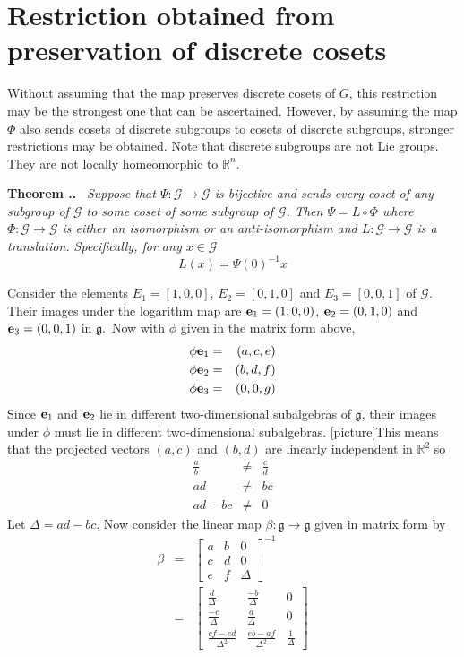 \documentclass[honours]{UNSWthesis}
\newcommand{\R}{\mathbb{R}}
\newcommand{\G}{\mathcal{G}}
\newcommand{\g}{\mathfrak{g}}
\newcommand{\1}{\mathbf{e}_{1}}
\newcommand{\2}{\mathbf{e}_{3}}
\newcommand{\3}{\mathbf{e}_{3}}
\newcounter{Item}[section]
\newenvironment{Theorem}{\medskip
                            \refstepcounter{Item}
                            \noindent
                           {\bf Theorem \thesection.\theItem.}\ %
                            \begingroup \sl}
                           {\endgroup\medskip}
\begin{document}

\section{Restriction obtained from preservation of discrete cosets}
Without assuming that the map preserves discrete cosets of $G$, this restriction may be the strongest one that can be ascertained. However, by assuming the map $\Phi$ also sends cosets of discrete subgroups to cosets of discrete subgroups, stronger restrictions may be obtained. Note that discrete subgroups are not Lie groups. They are not locally homeomorphic to $\R^{n}$. 

\begin{Theorem}
Suppose that $\Psi: \G \longrightarrow \G$ is bijective and sends every coset of \emph{any} subgroup of $\G$ to some coset of some subgroup of $\G$. Then $\Psi=L \circ \Phi$ where $\Phi:\G \longrightarrow \G$ is either an isomorphism or an anti-isomorphism and $L: \G \longrightarrow \G$ is a translation. Specifically, for any $x \in \G$
\[
L(x)=\Psi(0)^{-1}x
\]

\end{Theorem}

Consider the elements $E_{1}=[1,0,0]$, $E_{2}=[0,1,0]$ and $E_{3}=[0,0,1]$ of $\G$. Their images under the logarithm map are ${\bf e}_{1}=(1,0,0)$, ${\bf e}_{2}=(0,1,0)$ and ${\bf e}_{3}=(0,0,1)$ in $\g$.\
Now with $\phi$ given in the matrix form above,
\begin{eqnarray*}
\phi {\bf e}_{1} &=& (a,c,e) \\
\phi {\bf e}_{2} &=& (b,d,f) \\
\phi {\bf e}_{3} &=& (0,0,g)
\end{eqnarray*}
Since ${\bf e}_{1}$ and ${\bf e}_{2}$ lie in different two-dimensional subalgebras of $\g$, their images under $\phi$ must lie in different two-dimensional subalgebras. [picture]This means that the projected vectors $(a,c)$ and $(b,d)$ are linearly independent in $\R^{2}$ so 
\begin{eqnarray*}
\frac{a}{b} &\neq & \frac{c}{d} \\
ad &\neq & bc\\
ad-bc &\neq & 0 
\end{eqnarray*} Let $\Delta = ad-bc$.
Now consider the linear map $\beta:\g \longrightarrow \g$ given in matrix form by 
\begin{eqnarray*}
\beta &=& \begin{bmatrix}
a & b & 0 \\
c & d & 0 \\
e & f & \Delta
\end{bmatrix}^{-1} \\
&=& \begin{bmatrix}
\frac{d}{\Delta} & \frac{-b}{\Delta} & 0 \\
\frac{-c}{\Delta} & \frac{a}{\Delta} & 0 \\
\frac{cf-ed}{\Delta^{2}} & \frac{eb-af}{\Delta^{2}} & \frac{1}{\Delta}
\end{bmatrix}
\end{eqnarray*}
\end{document}
